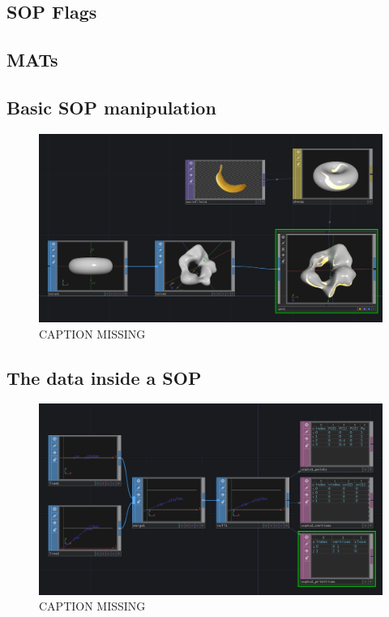 \subsection{SOP Flags}


\subsection{MATs}




\subsection{Basic SOP manipulation}

\begin{figure}[H]
  \centering
  \includegraphics[width=\textwidth]{img/noise3D.PNG}
  \caption[shortCaption]
  {CAPTION MISSING}
  \label{fig:label}
\end{figure}


\subsection{The data inside a SOP}
\begin{figure}[H]
  \centering
  \includegraphics[width=\textwidth]{img/sopToDat.PNG}
  \caption[shortCaption]
  {CAPTION MISSING}
  \label{fig:label}
\end{figure}


